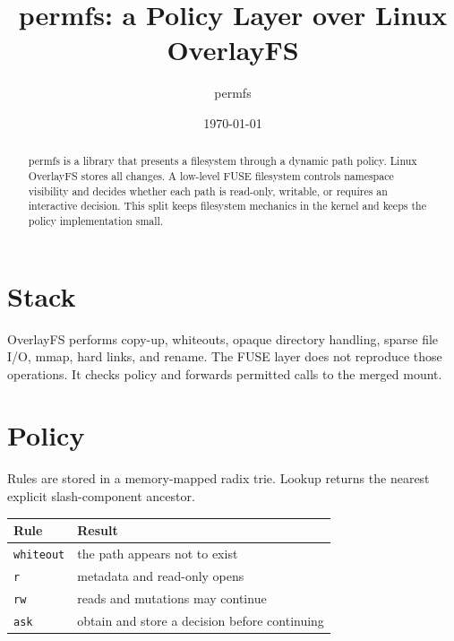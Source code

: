 \documentclass[11pt,a4paper]{article}
\title{permfs: a Policy Layer over Linux OverlayFS}
\author{permfs}
\date{\today}
\begin{document}
\maketitle

\begin{abstract}
permfs is a library that presents a filesystem through a dynamic path
policy. Linux OverlayFS stores all changes. A low-level FUSE filesystem
controls namespace visibility and decides whether each path is read-only,
writable, or requires an interactive decision. This split keeps filesystem
mechanics in the kernel and keeps the policy implementation small.
\end{abstract}

\section{Stack}

\begin{center}
\end{center}

OverlayFS performs copy-up, whiteouts, opaque directory handling, sparse file
I/O, mmap, hard links, and rename. The FUSE layer does not reproduce those
operations. It checks policy and forwards permitted calls to the merged mount.

\section{Policy}

Rules are stored in a memory-mapped radix trie. Lookup returns the nearest
explicit slash-component ancestor.

\begin{center}
\begin{tabular}{ll}
\toprule
Rule & Result\\
\midrule
\texttt{whiteout} & the path appears not to exist\\
\texttt{r} & metadata and read-only opens\\
\texttt{rw} & reads and mutations may continue\\
\texttt{ask} & obtain and store a decision before continuing\\
\bottomrule
\end{tabular}
\end{center}
\end{document}
